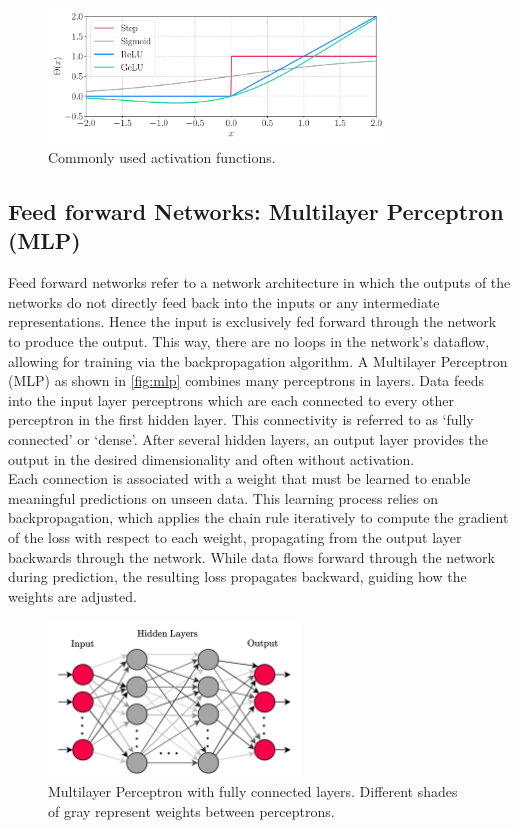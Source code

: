 \begin{figure}[H]
    \centering
    \includegraphics[width=0.8\textwidth]{../fig/background/activation_functions.pdf}
    \caption{Commonly used activation functions.}
    \label{fig:activation_functions}
\end{figure}
\subsection{Feed forward Networks: Multilayer Perceptron (MLP)}
\label{subsec:background_mlp}
Feed forward networks refer to a network architecture in which the outputs of the networks do not directly feed back into the inputs or any intermediate representations. Hence the input is exclusively fed forward through the network to produce the output. This way, there are no loops in the network's dataflow, allowing for training via the backpropagation algorithm. A Multilayer Perceptron (MLP) as shown in \autoref{fig:mlp} combines many perceptrons in layers. Data feeds into the input layer perceptrons which are each connected to every other perceptron in the first hidden layer. This connectivity is referred to as `fully connected' or `dense'. After several hidden layers, an output layer provides the output in the desired dimensionality and often without activation.\\
Each connection is associated with a weight that must be learned to enable meaningful predictions on unseen data. This learning process relies on backpropagation, which applies the chain rule iteratively to compute the gradient of the loss with respect to each weight, propagating from the output layer backwards through the network. While data flows forward through the network during prediction, the resulting loss propagates backward, guiding how the weights are adjusted. \\
\begin{figure}[H]
    \centering
    \includegraphics[width=0.6\textwidth]{../fig/background/MLP.pdf}
    \caption[Multilayer Perceptron]{Multilayer Perceptron with fully connected layers. Different shades of gray represent weights between perceptrons.}
    \label{fig:mlp}
\end{figure}

